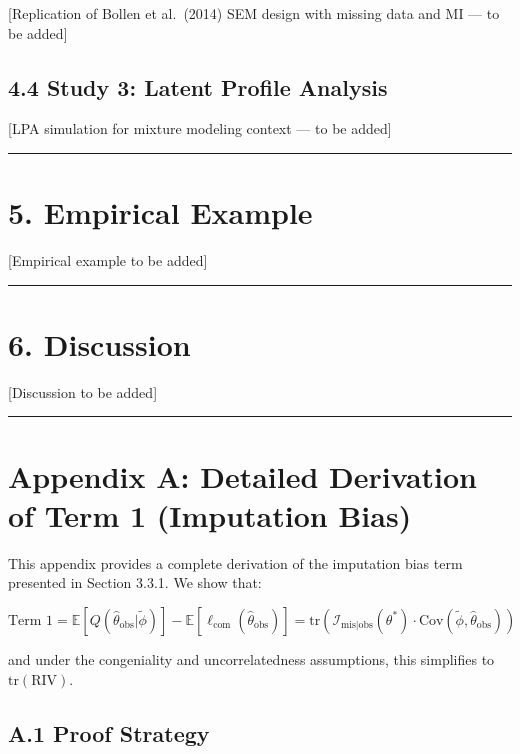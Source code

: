 \documentclass[
]{article}
\begin{document}
{[}Replication of Bollen et al.~(2014) SEM design with missing data and
MI --- to be added{]}

\subsection{4.4 Study 3: Latent Profile
Analysis}\label{study-3-latent-profile-analysis}

{[}LPA simulation for mixture modeling context --- to be added{]}

\begin{center}\rule{0.5\linewidth}{0.5pt}\end{center}

\section{5. Empirical Example}\label{sec-empirical}

{[}Empirical example to be added{]}

\begin{center}\rule{0.5\linewidth}{0.5pt}\end{center}

\section{6. Discussion}\label{sec-discussion}

{[}Discussion to be added{]}

\begin{center}\rule{0.5\linewidth}{0.5pt}\end{center}

\section{Appendix A: Detailed Derivation of Term 1 (Imputation
Bias)}\label{appendix-a}

This appendix provides a complete derivation of the imputation bias term
presented in Section 3.3.1. We show that:

\[\text{Term 1} = \mathbb{E}[Q(\hat{\theta}_{\text{obs}}|\tilde{\phi})] - \mathbb{E}[\ell_{\text{com}}(\hat{\theta}_{\text{obs}})] = \text{tr}\left(\mathcal{I}_{\text{mis}|\text{obs}}(\theta^*) \cdot \text{Cov}(\tilde{\phi}, \hat{\theta}_{\text{obs}})\right)\]

and under the congeniality and uncorrelatedness assumptions, this
simplifies to \(\text{tr}(\text{RIV})\).

\subsection{A.1 Proof Strategy}\label{a.1-proof-strategy}
\end{document}
